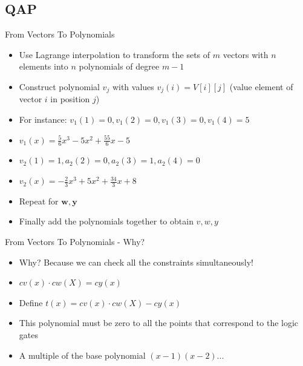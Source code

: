 \documentclass[handout]{beamer}
\begin{document}
\subsection{QAP}
\begin{frame}{From Vectors To Polynomials}
    \begin{itemize}
        \item Use Lagrange interpolation to transform the sets of $m$ vectors with $n$ elements into $n$ polynomials of degree $m-1$ \pause
        \item Construct polynomial $v_j$ with values $v_j(i) =V[i][j]$ (value element of vector $i$ in position $j$) \pause
        \item For instance: $v_1(1) = 0, v_1(2) = 0, v_1(3)=0, v_1(4) = 5$ \pause
        \item $v_1(x) = \frac{5}{6}x^3-5x^2+\frac{55}{6}x-5$ \pause
        \item $v_2(1) = 1, a_2(2) = 0, a_2(3)=1, a_2(4) = 0$ \pause
        \item $v_2(x) = -\frac{2}{3}x^3+5x^2+\frac{34}{3}x+8$ \pause
        \item Repeat for $\bm{w}, \bm{y}$ \pause
        \item Finally add the polynomials together to obtain $v,w,y$ \pause
    \end{itemize}
\end{frame}

\begin{frame}{From Vectors To Polynomials - Why?}
\begin{itemize}
    \item Why? Because we can check all the constraints simultaneously! \pause
    \item $cv(x) \cdot cw(X) = cy(x)$ \pause
    \item Define $t(x) = cv(x) \cdot cw(X) - cy(x)$ \pause
    \item This polynomial must be zero to all the points that correspond to the logic gates \pause
    \item A multiple of the base polynomial $(x-1)(x-2)...$
\end{itemize}
\end{frame}
\end{document}
